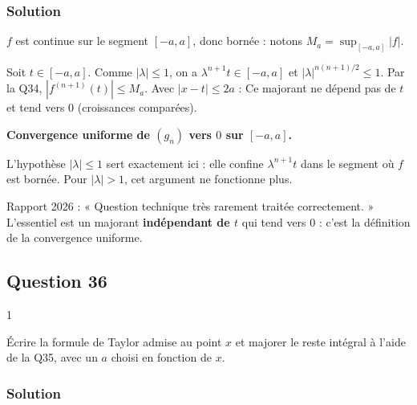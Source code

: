 \documentclass[11pt,a4paper]{article}
\newcommand{\equationajustee}[1]{%
  \sbox{\boiteequation}{$\displaystyle #1$}%
  \ifdim\wd\boiteequation>\linewidth
    \[\resizebox{\linewidth}{!}{\usebox{\boiteequation}}\]%
  \else
    \[#1\]%
  \fi}
\begin{document}
\hypertarget{solution-34}{%
\subsubsection{Solution}\label{solution-34}}

\(f\) est continue sur le segment \([-a,a]\), donc bornée : notons \(M_a=\sup_{[-a,a]}|f|\).

Soit \(t\in[-a,a]\). Comme \(|\lambda|\le1\), on a \(\lambda^{n+1}t\in[-a,a]\) et \(|\lambda|^{n(n+1)/2}\le1\). Par la Q34, \(|f^{(n+1)}(t)|\le M_a\). Avec \(|x-t|\le2a\) :
\equationajustee{\sup_{[-a,a]}|g_n|\le\frac{(2a)^n}{n!}M_a .}
Ce majorant ne dépend pas de \(t\) et tend vers \(0\) (croissances comparées).

\textbf{Convergence uniforme de \((g_n)\) vers \(0\) sur \([-a,a]\).}

\begin{methode}

L'hypothèse \(|\lambda|\le1\) sert exactement ici : elle confine \(\lambda^{n+1}t\) dans le segment où \(f\) est bornée. Pour \(|\lambda|>1\), cet argument ne fonctionne plus.

\end{methode}

\begin{jury}

Rapport 2026 : « Question technique très rarement traitée correctement. » L'essentiel est un majorant \textbf{indépendant de \(t\)} qui tend vers \(0\) : c'est la définition de la convergence uniforme.

\end{jury}

\hypertarget{question-36}{%
\subsection{Question 36}\label{question-36}}

\begin{indication}{1}

Écrire la formule de Taylor admise au point \(x\) et majorer le reste intégral à l'aide de la Q35, avec un \(a\) choisi en fonction de \(x\).

\end{indication}

\hypertarget{solution-35}{%
\subsubsection{Solution}\label{solution-35}}
\end{document}

